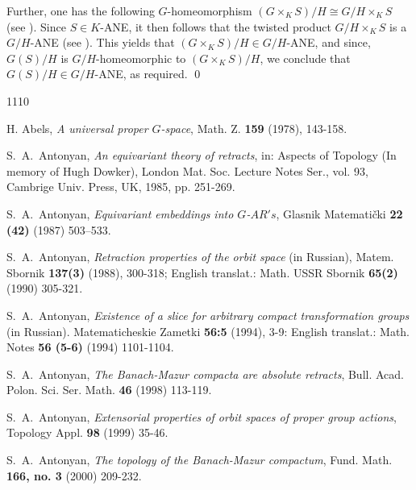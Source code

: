 \documentclass{amsart}
\begin{document}
Further, one has the following $G$-homeomorphism $(G\times_K S)/H\cong G/H\times_ K S$ (see \cite[Proposition 3.3]{ant:proper}). Since $S\in K$-{\rm ANE},  it then follows that the twisted product $G/H\times_ K S$ is a $G/H$-{\rm ANE} (see \cite[Proposition 3.3]{ant:proper}). This yields that  $(G\times_ K S)/H\in G/H$-{\rm ANE}, and since, $G(S)/H$ is $G/H$-homeomorphic to 
$(G\times_ K S)/H$, we conclude that $G(S)/H\in G/H$-{\rm ANE}, as required.
 \qed
  
  

 

\smallskip






\begin{thebibliography}{1110}


H. Abels, {\em  A universal proper $G$-space},  Math. Z. {\bf  159} (1978),  143-158.

 S.~A.~Antonyan, {\em An equivariant theory of retracts}, in: Aspects of Topology (In memory of Hugh Dowker), London Mat. Soc. Lecture Notes Ser., vol. 93, Cambrige Univ. Press, UK, 1985, pp. 251-269.

 S.~A.~Antonyan, {\em  Equivariant embeddings into $G$-$AR's$}, Glasnik Matemati\v cki {\bf 22 (42)} (1987)  503--533.

  S.~A.~Antonyan, {\em  Retraction properties of the orbit space} (in Russian), Matem. Sbornik {\bf 137(3)} (1988),  300-318; English translat.: Math. USSR Sbornik  {\bf 65(2)} (1990) 305-321.


  S.~A.~Antonyan, {\em  Existence of a slice for arbitrary compact transformation groups} (in Russian).  Matematicheskie Zametki {\bf 56:5} (1994),  3-9: English translat.:  Math. Notes {\bf 56 (5-6)} (1994)  1101-1104.


 S.~A.~Antonyan, {\em  The Banach-Mazur compacta are absolute retracts}, 
 Bull. Acad. Polon. Sci. Ser. Math. {\bf  46} (1998) 113-119.

 S.~A.~Antonyan, {\em  Extensorial properties of orbit spaces of proper group actions},  Topology Appl. {\bf  98} (1999) 35-46.

 S.~A.~Antonyan, {\em  The topology of the Banach-Mazur compactum},    Fund. Math. {\bf 166, no. 3} (2000) 209-232.


\end{thebibliography}
\end{document}
